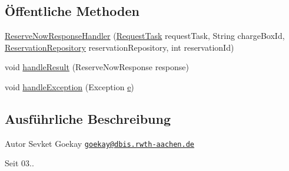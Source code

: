 \subsection*{Öffentliche Methoden}
\begin{DoxyCompactItemize}
\item 
\hyperlink{classde_1_1rwth_1_1idsg_1_1steve_1_1handler_1_1ocpp15_1_1_reserve_now_response_handler_a4fa6d13611deb6163089281485a7bad9}{Reserve\+Now\+Response\+Handler} (\hyperlink{classde_1_1rwth_1_1idsg_1_1steve_1_1web_1_1dto_1_1task_1_1_request_task}{Request\+Task} request\+Task, String charge\+Box\+Id, \hyperlink{interfacede_1_1rwth_1_1idsg_1_1steve_1_1repository_1_1_reservation_repository}{Reservation\+Repository} reservation\+Repository, int reservation\+Id)
\item 
void \hyperlink{classde_1_1rwth_1_1idsg_1_1steve_1_1handler_1_1ocpp15_1_1_reserve_now_response_handler_a8a9abad92eff0284e98129aaf31e811e}{handle\+Result} (Reserve\+Now\+Response response)
\item 
void \hyperlink{classde_1_1rwth_1_1idsg_1_1steve_1_1handler_1_1ocpp15_1_1_reserve_now_response_handler_a0fafdd840ba364a594893cad7c17a6c3}{handle\+Exception} (Exception \hyperlink{jquery-ui_8min_8js_a2c038346d47955cbe2cb91e338edd7e1}{e})
\end{DoxyCompactItemize}


\subsection{Ausführliche Beschreibung}
\begin{DoxyAuthor}{Autor}
Sevket Goekay \href{mailto:goekay@dbis.rwth-aachen.de}{\tt goekay@dbis.\+rwth-\/aachen.\+de} 
\end{DoxyAuthor}
\begin{DoxySince}{Seit}
03.. 
\end{DoxySince}


